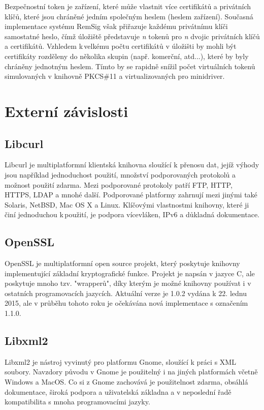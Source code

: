 \documentclass[]{fithesis3}
\begin{document}
	Bezpečnostní token je zařízení, které může vlastnit více certifikátů a privátních klíčů, které jsou 		chráněné jedním společným heslem (heslem zařízení). Současná implementace systému RemSig 		však přiřazuje každému privátnímu klíči samostatné heslo, čímž úložiště představuje \textit{n} 		tokenů pro \textit{n} dvojic privátních klíčů a certifikátů. Vzhledem k\,velkému počtu certifikátů v 	úložišti by mohli být certifikáty rozděleny do několika skupin (např. komerční, atd...), které by 		byly chráněny jednotným heslem. Tímto by se rapidně snížil počet virtuálních tokenů 				simulovaných v knihovně PKCS\#11 a virtualizovaných pro minidriver.
	
	\section{Externí závislosti}

		\subsection {Libcurl} 
		Libcurl je multiplatformní klientská knihovna sloužící k přenosu dat, jejíž výhody jsou 				například jednoduchost použití, množství podporovaných protokolů a možnost použití 				zdarma.  Mezi podporované protokoly patří FTP, HTTP, HTTPS, LDAP a mnohé další. 				Podporované platformy zahrnují mezi jinými také Solaris, NetBSD, Mac OS X a Linux. 				Klíčovými vlastnostmi knihovny, které ji činí jednoduchou k\,použití, je podpora vícevláken, 			IPv6 a důkladná dokumentace.

		\subsection {OpenSSL} 
		OpenSSL je multiplatformní open source projekt, který poskytuje knihovny implementující základní 				kryptografické funkce. Projekt je napsán v jazyce C, ale poskytuje mnoho tzv. "wrapperů", 			díky kterým je možné knihovny používat i v ostatních programovacích jazycích. Aktuální 			verze je 1.0.2 vydána k 22. lednu 2015, ale v průběhu tohoto roku je očekávána nová 			implementace s označením 1.1.0.

		\subsection {Libxml2} 
		Libxml2 je nástroj vyvinutý pro platformu Gnome, sloužící k práci s XML soubory. Navzdory 		původu v Gnome je použitelný i na jiných platformách včetně Windows a MacOS. Co si z 				Gnome zachovává je použitelnost zdarma, obsáhlá dokumentace, široká podpora a 				uživatelská základna a v neposlední řadě kompatibilita s mnoha programovacími jazyky.
\end{document}
